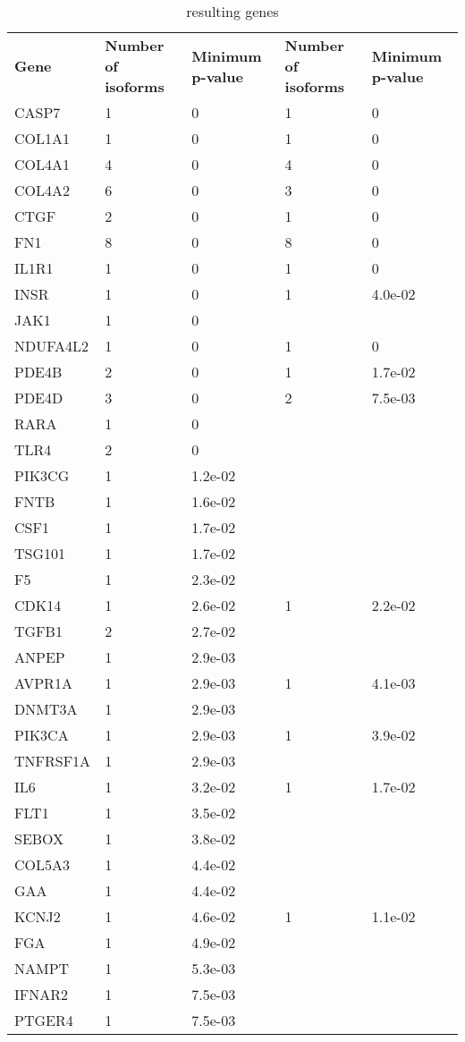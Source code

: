 \documentclass[fleqn,10pt]{SelfArx} %
\begin{document}
\begin{table}[htb]
	\centering
	\begin{tabularx}{\linewidth}{XRRRR}
		\textbf{\color{white} Gene} & \textbf{\color{white} Number of isoforms} & \textbf{\color{white} Minimum p-value} & \textbf{\color{white} Number of isoforms} & \textbf{\color{white} Minimum p-value} \\ 
		CASP7 & 1 & 0 & 1 & 0 \\ 
		COL1A1 & 1 & 0 & 1 & 0 \\ 
		COL4A1 & 4 & 0 & 4 & 0 \\ 
		COL4A2 & 6 & 0 & 3 & 0 \\ 
		CTGF & 2 & 0 & 1 & 0 \\ 
		FN1 & 8 & 0 & 8 & 0 \\ 
		IL1R1 & 1 & 0 & 1 & 0 \\ 
		INSR & 1 & 0 & 1 & 4.0e-02 \\ 
		JAK1 & 1 & 0 &  &  \\ 
		NDUFA4L2 & 1 & 0 & 1 & 0 \\ 
		PDE4B & 2 & 0 & 1 & 1.7e-02 \\ 
		PDE4D & 3 & 0 & 2 & 7.5e-03 \\ 
		RARA & 1 & 0 &  &  \\ 
		TLR4 & 2 & 0 &  &  \\ 
		PIK3CG & 1 & 1.2e-02 &  &  \\ 
		FNTB & 1 & 1.6e-02 &  &  \\ 
		CSF1 & 1 & 1.7e-02 &  &  \\ 
		TSG101 & 1 & 1.7e-02 &  &  \\ 
		F5 & 1 & 2.3e-02 &  &  \\ 
		CDK14 & 1 & 2.6e-02 & 1 & 2.2e-02 \\ 
		TGFB1 & 2 & 2.7e-02 &  &  \\ 
		ANPEP & 1 & 2.9e-03 &  &  \\ 
		AVPR1A & 1 & 2.9e-03 & 1 & 4.1e-03 \\ 
		DNMT3A & 1 & 2.9e-03 &  &  \\ 
		PIK3CA & 1 & 2.9e-03 & 1 & 3.9e-02 \\ 
		TNFRSF1A & 1 & 2.9e-03 &  &  \\ 
		IL6 & 1 & 3.2e-02 & 1 & 1.7e-02 \\ 
		FLT1 & 1 & 3.5e-02 &  &  \\ 
		SEBOX & 1 & 3.8e-02 &  &  \\ 
		COL5A3 & 1 & 4.4e-02 &  &  \\ 
		GAA & 1 & 4.4e-02 &  &  \\ 
		KCNJ2 & 1 & 4.6e-02 & 1 & 1.1e-02 \\ 
		FGA & 1 & 4.9e-02 &  &  \\ 
		NAMPT & 1 & 5.3e-03 &  &  \\ 
		IFNAR2 & 1 & 7.5e-03 &  &  \\ 
		PTGER4 & 1 & 7.5e-03 &  &  \\ 
	\end{tabularx}
	\smallskip
	\caption{resulting genes}
	\label{tab:sign}
\end{table}
\end{document}
